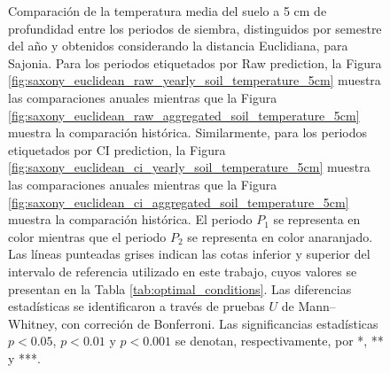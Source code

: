 \begin{figure}[htbp]
	\caption{
		Comparación de la temperatura media del suelo a 5 cm de profundidad entre los periodos de siembra, distinguidos por semestre del año y obtenidos considerando la distancia Euclidiana, para Sajonia. Para los periodos etiquetados por Raw prediction, la Figura \ref{fig:saxony_euclidean_raw_yearly_soil_temperature_5cm} muestra las comparaciones anuales mientras que la Figura \ref{fig:saxony_euclidean_raw_aggregated_soil_temperature_5cm} muestra la comparación histórica. Similarmente, para los periodos etiquetados por CI prediction, la Figura \ref{fig:saxony_euclidean_ci_yearly_soil_temperature_5cm} muestra las comparaciones anuales mientras que la Figura \ref{fig:saxony_euclidean_ci_aggregated_soil_temperature_5cm} muestra la comparación histórica. El periodo $P_1$ se representa en color mientras que el periodo $P_2$ se representa en color anaranjado. Las líneas punteadas grises indican las cotas inferior y superior del intervalo de referencia utilizado en este trabajo, cuyos valores se presentan en la Tabla \ref{tab:optimal_conditions}. Las diferencias estadísticas se identificaron a través de pruebas $U$ de Mann--Whitney, con correción de Bonferroni. Las significancias estadísticas $p<0.05$, $p<0.01$ y $p<0.001$ se denotan, respectivamente, por *, ** y ***.
	}
	\label{fig:saxony_euclidean_soil_temperature_5cm}
	
	
\end{figure}



